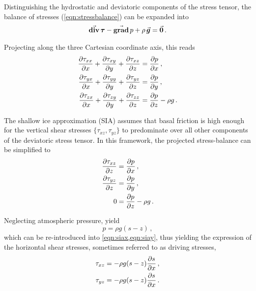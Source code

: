 \documentclass{article}
\newcommand{\vect}[1]{\va*{#1}} %
\newcommand{\tens}[1]{\vb*{#1}} %
\renewcommand{\grad}[1]{\vect{\mathrm{grad}}\,#1}   %
\newcommand{\tdiv}[1]{\vect{\mathrm{div}}\,#1}      %
\newcommand{\DST}[0]{\tens{\tau}}       %
\begin{document}
Distinguishing the hydrostatic and deviatoric components of the stress tensor,
the balance of stresses (\ref{eqn:stressbalance}) can be expanded into
\begin{equation}
    \tdiv{\DST} - \grad{p} + \rho\,\vect{g} = \vect{0} \,.
\end{equation}

Projecting along the three Cartesian coordinate axis, this reads
\begin{subequations}
\label{eqn:fullstokes}
\begin{align}
    \pdv{\tau_{xx}}{x} + \pdv{\tau_{xy}}{y} + \pdv{\tau_{xz}}{z}
        &= \pdv{p}{x} \,, \\
    \pdv{\tau_{yx}}{x} + \pdv{\tau_{yy}}{y} + \pdv{\tau_{yz}}{z}
        &= \pdv{p}{y} \,, \\
    \pdv{\tau_{zx}}{x} + \pdv{\tau_{zy}}{y} + \pdv{\tau_{zz}}{z}
        &= \pdv{p}{z} - \rho g \,.
\end{align}
\end{subequations}

The shallow ice approximation (SIA) assumes that basal friction is high enough
for the vertical shear stresses $\{\tau_{xz}, \tau_{yz}\}$ to predominate over
all other components of the deviatoric stress tensor. In this framework, the
projected stress-balance can be simplified to
\begin{subequations}
\label{eqn:sia}
\begin{align}
    \label{eqn:siax}
    \pdv{\tau_{xz}}{z} &= \pdv{p}{x} \,, \\
    \label{eqn:siay}
    \pdv{\tau_{yz}}{z} &= \pdv{p}{y} \,, \\
    \label{eqn:siaz}
    0 &= \pdv{p}{z} - \rho g \,.
\end{align}
\end{subequations}

Neglecting atmospheric pressure,  yield
\begin{equation}
    p = \rho g (s-z) \,,
\end{equation}
which can be re-introduced into \cref{eqn:siax,eqn:siay}, thus yielding the
expression of the horizontal shear stresses, sometimes referred to as driving
stresses,
\begin{subequations}
\begin{align}
    \tau_{xz} &= -\rho g (s-z) \pdv{s}{x} \,, \\
    \tau_{yz} &= -\rho g (s-z) \pdv{s}{x} \,.
\end{align}
\end{subequations}
\end{document}
